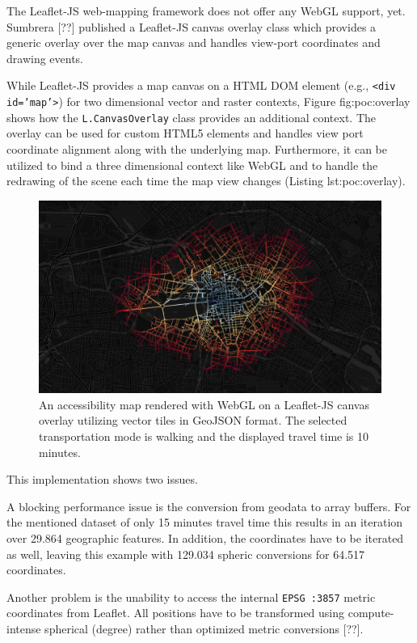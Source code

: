       The Leaflet-JS web-mapping framework does not offer any WebGL support, yet. Sumbrera [??] published a Leaflet-JS canvas overlay class which provides a generic overlay over the map canvas and handles view-port coordinates and drawing events.\par
      
      While Leaflet-JS provides a map canvas on a HTML DOM element (e.g., \texttt{<div id='map'>}) for two dimensional vector and raster contexts, Figure {fig:poc:overlay} shows how the \texttt{L.CanvasOverlay} class provides an additional context. The overlay can be used for custom HTML5 elements and handles view port coordinate alignment along with the underlying map. Furthermore, it can be utilized to bind a three dimensional context like WebGL and to handle the redrawing of the scene each time the map view changes (Listing {lst:poc:overlay}).\par
      \begin{figure}[h]
        \centering
        \includegraphics[width=0.7\linewidth]{./img/screenshot-poc2-600s-vector.png}
        \caption{An accessibility map rendered with WebGL on a Leaflet-JS canvas overlay utilizing vector tiles in GeoJSON format. The selected transportation mode is walking and the displayed travel time is 10 minutes.}
        \label{fig:poc:two}
      \end{figure}
      This implementation shows two issues.\par
      A blocking performance issue is the conversion from geodata to array buffers. For the mentioned dataset of only 15 minutes travel time this results in an iteration over 29.864 geographic features. In addition, the coordinates have to be iterated as well, leaving this example with 129.034 spheric conversions for 64.517 coordinates.\par
      Another problem is the unability to access the internal \texttt{EPSG :3857} metric coordinates from Leaflet. All positions have to be transformed using compute-intense spherical (degree) rather than optimized metric conversions [??].\par
